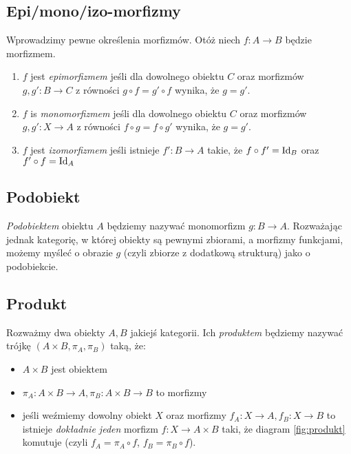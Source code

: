 \subsection{Epi/mono/izo-morfizmy}
Wprowadzimy pewne określenia morfizmów. Otóż niech $f:A\to B$ będzie morfizmem.

\begin{enumerate}
  \item $f$ jest \emph{epimorfizmem} jeśli dla dowolnego obiektu $C$ oraz morfizmów $g, g': B\to C$ z równości $g\circ f= g'\circ f$ wynika, że $g=g'$.
  \item $f$ is \emph{monomorfizmem} jeśli dla dowolnego obiektu $C$ oraz morfizmów $g, g': X\to A$ z równości $f\circ g= f\circ g'$ wynika, że
  $g=g'$.
  \item $f$ jest \emph{izomorfizmem} jeśli istnieje $f':B\to A$ takie, że $f\circ f'=\text{Id}_B$ oraz $f'\circ f=\text{Id}_A$
\end{enumerate}




\subsection{Podobiekt}
\textit{Podobiektem} obiektu $A$ będziemy nazywać monomorfizm $g: B\to A$. Rozważając jednak kategorię, w której obiekty są pewnymi zbiorami, a morfizmy funkcjami, możemy
myśleć o obrazie $g$ (czyli zbiorze z dodatkową strukturą) jako o podobiekcie.



\subsection{Produkt}
Rozważmy dwa obiekty $A, B$ jakiejś kategorii. Ich \emph{produktem} będziemy nazywać
trójkę $(A\times B, \pi_A, \pi_B)$ taką, że:
\begin{itemize}
  \item $A\times B$ jest obiektem
  \item $\pi_A: A\times B\to A, \pi_B:A\times B\to B$ to morfizmy
  \item jeśli weźmiemy dowolny obiekt $X$ oraz morfizmy $f_A: X\to A, f_B: X\to B$ to
    istnieje \textit{dokładnie jeden} morfizm $f:X\to A\times B$ taki, że diagram \ref{fig:produkt} komutuje (czyli $f_A=\pi_A\circ f$, $f_B=\pi_B\circ f$).
\end{itemize}

